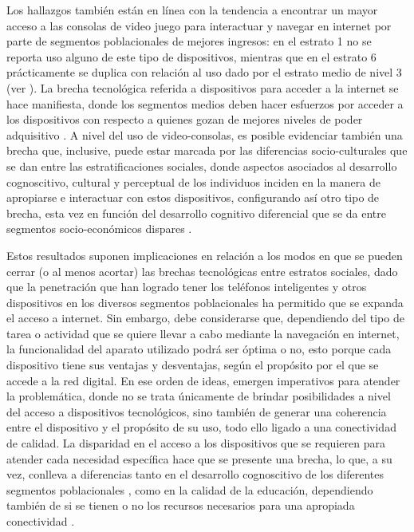\documentclass[spanish]{textolivre}
\begin{document}
Los hallazgos también están en línea con la tendencia a encontrar un mayor acceso a las consolas de video juego para interactuar y navegar en internet por parte de segmentos poblacionales de mejores ingresos: en el estrato 1 no se reporta uso alguno de este tipo de dispositivos, mientras que en el estrato 6 prácticamente se duplica con relación al uso dado por el estrato medio de nivel 3 (ver ). La brecha tecnológica referida a dispositivos para acceder a la internet se hace manifiesta, donde los segmentos medios deben hacer esfuerzos por acceder a los dispositivos con respecto a quienes gozan de mejores niveles de poder adquisitivo \cite{aristizabal2020, lareau2003, vincent2007}. A nivel del uso de video-consolas, es posible evidenciar también una brecha que, inclusive, puede estar marcada por las diferencias socio-culturales que se dan entre las estratificaciones sociales, donde aspectos asociados al desarrollo cognoscitivo, cultural y perceptual de los individuos inciden en la manera de apropiarse e interactuar con estos dispositivos, configurando así otro tipo de brecha, esta vez en función del desarrollo cognitivo diferencial que se da entre segmentos socio-económicos dispares \cite{del_villar_munoz2006}.

Estos resultados suponen implicaciones en relación a los modos en que se pueden cerrar (o al menos acortar) las brechas tecnológicas entre estratos sociales, dado que la penetración que han logrado tener los teléfonos inteligentes y otros dispositivos en los diversos segmentos poblacionales ha permitido que se expanda el acceso a internet. Sin embargo, debe considerarse que, dependiendo del tipo de tarea o actividad que se quiere llevar a cabo mediante la navegación en internet, la funcionalidad del aparato utilizado podrá ser óptima o no, esto porque cada dispositivo tiene sus ventajas y desventajas, según el propósito por el que se accede a la red digital. En ese orden de ideas, emergen imperativos para atender la problemática, donde no se trata únicamente de brindar posibilidades a nivel del acceso a dispositivos tecnológicos, sino también de generar una coherencia entre el dispositivo y el propósito de su uso, todo ello ligado a una conectividad de calidad. La disparidad en el acceso a los dispositivos que se requieren para atender cada necesidad específica hace que se presente una brecha, lo que, a su vez, conlleva a diferencias tanto en el desarrollo cognoscitivo de los diferentes segmentos poblacionales \cite{del_villar_munoz2006}, como en la calidad de la educación, dependiendo también de si se tienen o no los recursos necesarios para una apropiada conectividad \cite{lopez2020}.
\end{document}
